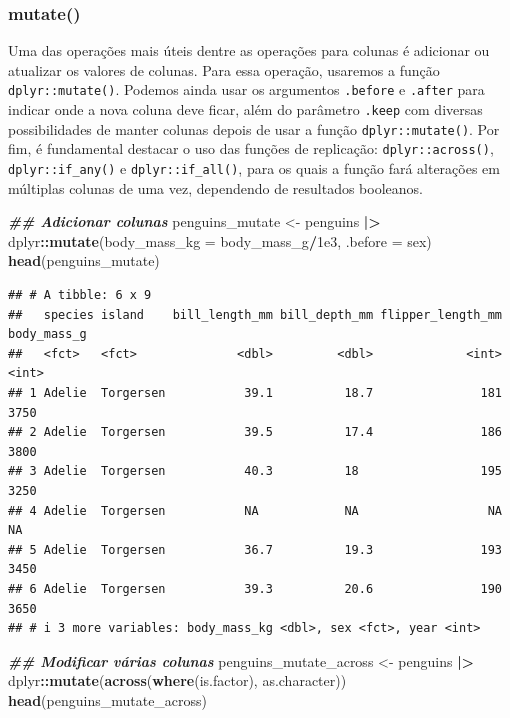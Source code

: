 \documentclass[
]{article}
\newenvironment{Shaded}{\begin{snugshade}}{\end{snugshade}}
\newcommand{\AttributeTok}[1]{\textcolor[rgb]{0.13,0.29,0.53}{#1}}
\newcommand{\DocumentationTok}[1]{\textcolor[rgb]{0.56,0.35,0.01}{\textbf{\textit{#1}}}}
\newcommand{\FloatTok}[1]{\textcolor[rgb]{0.00,0.00,0.81}{#1}}
\newcommand{\FunctionTok}[1]{\textcolor[rgb]{0.13,0.29,0.53}{\textbf{#1}}}
\newcommand{\NormalTok}[1]{#1}
\newcommand{\OtherTok}[1]{\textcolor[rgb]{0.56,0.35,0.01}{#1}}
\newcommand{\SpecialCharTok}[1]{\textcolor[rgb]{0.81,0.36,0.00}{\textbf{#1}}}
\begin{document}
\hypertarget{mutate}{%
\subsubsection{mutate()}\label{mutate}}

Uma das operações mais úteis dentre as operações para colunas é adicionar ou atualizar os valores de colunas. Para essa operação, usaremos a função \texttt{dplyr::mutate()}. Podemos ainda usar os argumentos \texttt{.before} e \texttt{.after} para indicar onde a nova coluna deve ficar, além do parâmetro \texttt{.keep} com diversas possibilidades de manter colunas depois de usar a função \texttt{dplyr::mutate()}. Por fim, é fundamental destacar o uso das funções de replicação: \texttt{dplyr::across()}, \texttt{dplyr::if\_any()} e \texttt{dplyr::if\_all()}, para os quais a função fará alterações em múltiplas colunas de uma vez, dependendo de resultados booleanos.

\begin{Shaded}
\begin{Highlighting}[]
\DocumentationTok{\#\# Adicionar colunas}
\NormalTok{penguins\_mutate }\OtherTok{\textless{}{-}}\NormalTok{ penguins }\SpecialCharTok{|\textgreater{}} 
\NormalTok{    dplyr}\SpecialCharTok{::}\FunctionTok{mutate}\NormalTok{(}\AttributeTok{body\_mass\_kg =}\NormalTok{ body\_mass\_g}\SpecialCharTok{/}\FloatTok{1e3}\NormalTok{, }\AttributeTok{.before =}\NormalTok{ sex)}
\FunctionTok{head}\NormalTok{(penguins\_mutate)}
\end{Highlighting}
\end{Shaded}

\begin{verbatim}
## # A tibble: 6 x 9
##   species island    bill_length_mm bill_depth_mm flipper_length_mm body_mass_g
##   <fct>   <fct>              <dbl>         <dbl>             <int>       <int>
## 1 Adelie  Torgersen           39.1          18.7               181        3750
## 2 Adelie  Torgersen           39.5          17.4               186        3800
## 3 Adelie  Torgersen           40.3          18                 195        3250
## 4 Adelie  Torgersen           NA            NA                  NA          NA
## 5 Adelie  Torgersen           36.7          19.3               193        3450
## 6 Adelie  Torgersen           39.3          20.6               190        3650
## # i 3 more variables: body_mass_kg <dbl>, sex <fct>, year <int>
\end{verbatim}

\begin{Shaded}
\begin{Highlighting}[]
\DocumentationTok{\#\# Modificar várias colunas}
\NormalTok{penguins\_mutate\_across }\OtherTok{\textless{}{-}}\NormalTok{ penguins }\SpecialCharTok{|\textgreater{}} 
\NormalTok{    dplyr}\SpecialCharTok{::}\FunctionTok{mutate}\NormalTok{(}\FunctionTok{across}\NormalTok{(}\FunctionTok{where}\NormalTok{(is.factor), as.character))}
\FunctionTok{head}\NormalTok{(penguins\_mutate\_across)}
\end{Highlighting}
\end{Shaded}
\end{document}
